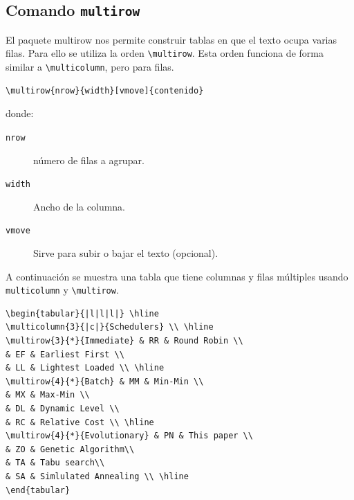 \documentclass[12pt,a4paper, oneside]{report}
\begin{document}
\subsection{Comando \texttt{multirow}}

El paquete multirow nos permite construir tablas en que el texto ocupa varias filas. Para ello se utiliza la orden \verb+\multirow+. Esta orden funciona de forma similar a \verb+\multicolumn+, pero para filas.

\begin{verbatim}
\multirow{nrow}{width}[vmove]{contenido}
\end{verbatim}
donde:

\begin{description}
\item [\texttt{nrow}] número de filas a agrupar.
\item [\texttt{width}] Ancho de la columna.
\item [\texttt{vmove}] Sirve para subir o bajar el texto (opcional).
\end{description}

A continuación se muestra una tabla que tiene columnas y filas múltiples usando \verb+multicolumn+ y \verb+\multirow+.

\begin{lstlisting}
\begin{tabular}{|l|l|l|} \hline
\multicolumn{3}{|c|}{Schedulers} \\ \hline
\multirow{3}{*}{Immediate} & RR & Round Robin \\
& EF & Earliest First \\
& LL & Lightest Loaded \\ \hline
\multirow{4}{*}{Batch} & MM & Min-Min \\
& MX & Max-Min \\
& DL & Dynamic Level \\
& RC & Relative Cost \\ \hline
\multirow{4}{*}{Evolutionary} & PN & This paper \\
& ZO & Genetic Algorithm\\
& TA & Tabu search\\
& SA & Simlulated Annealing \\ \hline
\end{tabular}
\end{lstlisting}
\end{document}
